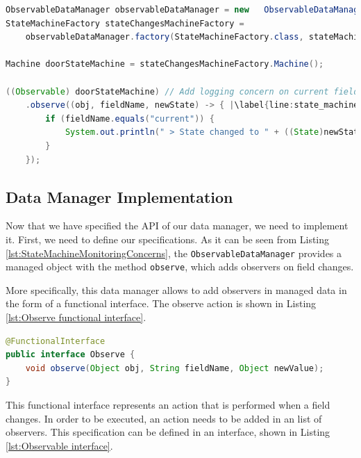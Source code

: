 \begin{sourcecode} [H]
	\begin{lstlisting}[language=Java, escapechar=|]
ObservableDataManager observableDataManager = new 	ObservableDataManager();
StateMachineFactory stateChangesMachineFactory =
	observableDataManager.factory(StateMachineFactory.class, stateMachineSchema);

Machine doorStateMachine = stateChangesMachineFactory.Machine();

((Observable) doorStateMachine) // Add logging concern on current field changes
	.observe((obj, fieldName, newState) -> { |\label{line:state_machine_monitor}|
		if (fieldName.equals("current")) {
			System.out.println(" > State changed to " + ((State)newState).name());
		}
	});
	\end{lstlisting}
	\caption{Door state machine with logging concern}
	\label{lst:StateMachineMonitoringConcerns}
\end{sourcecode}

\subsection{Data Manager Implementation}
Now that we have specified the API of our data manager, we need to implement it.
First, we need to define our specifications.
As it can be seen from Listing \ref{lst:StateMachineMonitoringConcerns}, the \texttt{ObservableDataManager} provides a managed object with the method \texttt{observe}, which adds observers on field changes.

More specifically, this data manager allows to add observers in managed data in the form of a functional interface.
The observe action is shown in Listing \ref{lst:Observe functional interface}.

\begin{sourcecode} [H]
	\begin{lstlisting}[language=Java, escapechar=|]
@FunctionalInterface
public interface Observe {
	void observe(Object obj, String fieldName, Object newValue);
}
	\end{lstlisting}
	\caption{Observe Functional Interface}
	\label{lst:Observe functional interface}
\end{sourcecode}

This functional interface represents an action that is performed when a field changes.
In order to be executed, an action needs to be added in an list of observers.
This specification can be defined in an interface, shown in Listing \ref{lst:Observable interface}.

